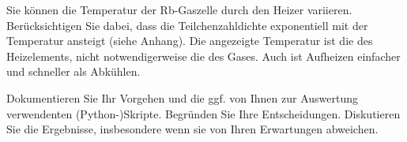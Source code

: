 Sie können die Temperatur der Rb-Gaszelle durch den Heizer variieren. Berücksichtigen Sie dabei, dass die Teilchenzahldichte exponentiell mit der Temperatur ansteigt (siehe Anhang). Die angezeigte Temperatur ist die des Heizelements, nicht notwendigerweise die des Gases. Auch ist Aufheizen einfacher und schneller als Abkühlen.



\auftraege


Dokumentieren Sie Ihr Vorgehen und die ggf. von Ihnen zur Auswertung verwendenten (Python-)Skripte. Begründen Sie Ihre Entscheidungen. Diskutieren Sie die Ergebnisse, insbesondere wenn sie von Ihren Erwartungen abweichen.


		
		
		
		
	
	
